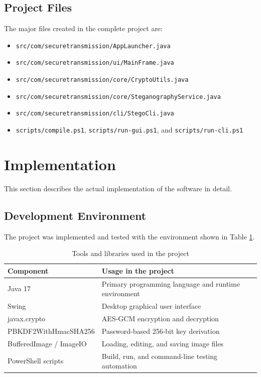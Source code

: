 \documentclass[12pt]{report}
\begin{document}
\subsection{Project Files}
The major files created in the complete project are:
\begin{itemize}
    \item \texttt{src/com/securetransmission/AppLauncher.java}
    \item \texttt{src/com/securetransmission/ui/MainFrame.java}
    \item \texttt{src/com/securetransmission/core/CryptoUtils.java}
    \item \texttt{src/com/securetransmission/core/SteganographyService.java}
    \item \texttt{src/com/securetransmission/cli/StegoCli.java}
    \item \texttt{scripts/compile.ps1}, \texttt{scripts/run-gui.ps1}, and \texttt{scripts/run-cli.ps1}
\end{itemize}

\section{Implementation}
This section describes the actual implementation of the software in detail.

\subsection{Development Environment}
The project was implemented and tested with the environment shown in Table \ref{tab:tools}.

\begin{table}[H]
    \centering
    \caption{Tools and libraries used in the project}
    \label{tab:tools}
    \begin{tabularx}{\textwidth}{|p{4.2cm}|X|}
        \hline
        \textbf{Component} & \textbf{Usage in the project} \\
        \hline
        Java 17 & Primary programming language and runtime environment \\
        \hline
        Swing & Desktop graphical user interface \\
        \hline
        javax.crypto & AES-GCM encryption and decryption \\
        \hline
        PBKDF2WithHmacSHA256 & Password-based 256-bit key derivation \\
        \hline
        BufferedImage / ImageIO & Loading, editing, and saving image files \\
        \hline
        PowerShell scripts & Build, run, and command-line testing automation \\
        \hline
    \end{tabularx}
\end{table}
\end{document}

